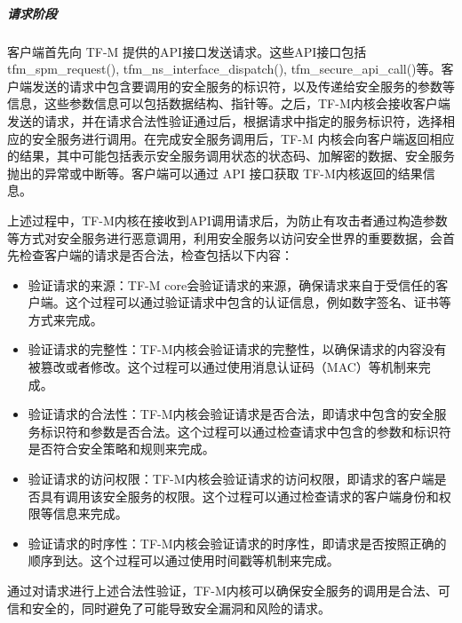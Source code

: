 \documentclass[UTF8,12pt,a4paper]{ctexart}
\numberwithin{figure}{section}
\begin{document}
\subparagraph{请求阶段}
\par 客户端首先向 TF-M 提供的API接口发送请求。这些API接口包括tfm\_spm\_request(), tfm\_ns\_interface\_dispatch(), tfm\_secure\_api\_call()等。客户端发送的请求中包含要调用的安全服务的标识符，以及传递给安全服务的参数等信息，这些参数信息可以包括数据结构、指针等。之后，TF-M内核会接收客户端发送的请求，并在请求合法性验证通过后，根据请求中指定的服务标识符，选择相应的安全服务进行调用。在完成安全服务调用后，TF-M 内核会向客户端返回相应的结果，其中可能包括表示安全服务调用状态的状态码、加解密的数据、安全服务抛出的异常或中断等。客户端可以通过 API 接口获取 TF-M内核返回的结果信息。
\par 上述过程中，TF-M内核在接收到API调用请求后，为防止有攻击者通过构造参数等方式对安全服务进行恶意调用，利用安全服务以访问安全世界的重要数据，会首先检查客户端的请求是否合法，检查包括以下内容：
\begin{itemize}
    \item 验证请求的来源：TF-M core会验证请求的来源，确保请求来自于受信任的客户端。这个过程可以通过验证请求中包含的认证信息，例如数字签名、证书等方式来完成。
    \item 验证请求的完整性：TF-M内核会验证请求的完整性，以确保请求的内容没有被篡改或者修改。这个过程可以通过使用消息认证码（MAC）等机制来完成。
    \item  验证请求的合法性：TF-M内核会验证请求是否合法，即请求中包含的安全服务标识符和参数是否合法。这个过程可以通过检查请求中包含的参数和标识符是否符合安全策略和规则来完成。
    \item  验证请求的访问权限：TF-M内核会验证请求的访问权限，即请求的客户端是否具有调用该安全服务的权限。这个过程可以通过检查请求的客户端身份和权限等信息来完成。
    \item  验证请求的时序性：TF-M内核会验证请求的时序性，即请求是否按照正确的顺序到达。这个过程可以通过使用时间戳等机制来完成。
\end{itemize}
\par 通过对请求进行上述合法性验证，TF-M内核可以确保安全服务的调用是合法、可信和安全的，同时避免了可能导致安全漏洞和风险的请求。
\end{document}
